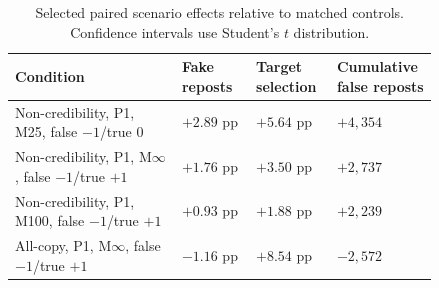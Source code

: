 \begin{table}[tbp]
\centering
\caption{Selected paired scenario effects relative to matched controls. Confidence intervals use Student's $t$ distribution.}
\label{tab:strategies}
\small
\begin{tabular}{p{0.36\linewidth}p{0.16\linewidth}p{0.16\linewidth}p{0.16\linewidth}}
\toprule
Condition & Fake reposts & Target selection & Cumulative false reposts \\
\midrule
Non-credibility, P1, M25, false $-1$/true $0$ & $+2.89$ pp & $+5.64$ pp & $+4,354$ \\
Non-credibility, P1, M$\infty$, false $-1$/true $+1$ & $+1.76$ pp & $+3.50$ pp & $+2,737$ \\
Non-credibility, P1, M100, false $-1$/true $+1$ & $+0.93$ pp & $+1.88$ pp & $+2,239$ \\
All-copy, P1, M$\infty$, false $-1$/true $+1$ & $-1.16$ pp & $+8.54$ pp & $-2,572$ \\
\bottomrule
\end{tabular}
\end{table}
